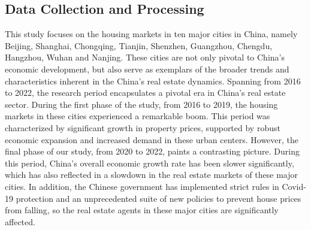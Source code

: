 \documentclass[11pt]{article}
\begin{document}
\subsection{Data Collection and Processing} \label{subsec:data_collection}

This study focuses on the housing markets in ten major cities in China, namely Beijing, Shanghai, Chongqing, Tianjin, Shenzhen, Guangzhou, Chengdu, Hangzhou, Wuhan and Nanjing. These cities are not only pivotal to China's economic development, but also serve as exemplars of the broader trends and characteristics inherent in the China's real estate dynamics. Spanning from 2016 to 2022, the research period encapsulates a pivotal era in China's real estate sector. During the first phase of the study, from 2016 to 2019, the housing markets in these cities experienced a remarkable boom. This period was characterized by significant growth in property prices, supported by robust economic expansion and increased demand in these urban centers. However, the final phase of our study, from 2020 to 2022, paints a contrasting picture. During this period, China's overall economic growth rate has been slower significantly, which has also reflected in a slowdown in the real estate markets of these major cities. In addition, the Chinese government has implemented strict rules in Covid-19 protection and an unprecedented suite of new policies to prevent house prices from falling, so the real estate agents in these major cities are significantly affected.
\end{document}

